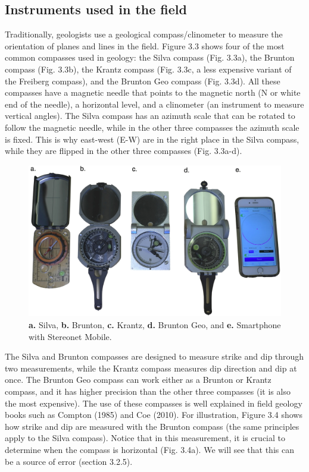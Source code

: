 \documentclass[a4paper , 12pt]{book}
\begin{document}
\subsection{Instruments used in the field}

Traditionally, geologists use a geological compass/clinometer to measure the orientation of planes and lines in the field. Figure 3.3 shows four of the most common compasses used in geology: the Silva compass (Fig. 3.3a), the Brunton compass (Fig. 3.3b), the Krantz compass (Fig. 3.3c, a less expensive variant of the Freiberg compass), and the Brunton Geo compass (Fig. 3.3d). All these compasses have a magnetic needle that points  to the magnetic north (N or white end of the needle), a horizontal level, and a clinometer (an instrument to measure vertical angles). The Silva compass has an azimuth scale that can be rotated to follow the magnetic needle, while in the other three compasses the azimuth scale is fixed. This is why east-west (E-W) are in the right place in the Silva compass, while they are flipped in the other three compasses (Fig. 3.3a-d).

\begin{figure}[ht]
    \centering
    \includegraphics[width=13cm]{Figures/ch3f3.png}
    \caption{\textbf{a.} Silva, \textbf{b.} Brunton, \textbf{c.} Krantz, \textbf{d.} Brunton Geo, and \textbf{e.} Smartphone with Stereonet Mobile.}
\end{figure}

The Silva and Brunton compasses are designed to measure strike and dip through two measurements, while the Krantz compass measures dip direction and dip at once. The Brunton Geo compass can work either as a Brunton or Krantz compass, and it has higher precision than the other three compasses (it is also the most expensive). The use of these compasses is well explained in field geology books such as Compton (1985) and Coe (2010). For illustration, Figure 3.4 shows how strike and dip are measured with the Brunton compass (the same principles apply to the Silva compass). Notice that in this measurement, it is crucial to determine when the compass is horizontal (Fig. 3.4a). We will see that this can be a source of error (section 3.2.5).
\end{document}
